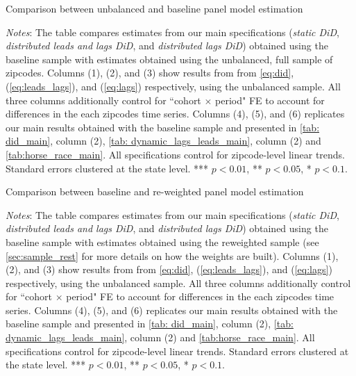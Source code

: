 \clearpage
\begin{table}[h!]
    \caption{Comparison between unbalanced and baseline panel model estimation}
    \label{tab:comparison_unbal_base}
    \centering
     \resizebox{\textwidth}{!}{
    \vspace{0pt}    
    
    }
    \begin{minipage}{.95\textwidth} \footnotesize
		\vspace{3mm} 
		\textit{Notes}: The table compares estimates from our main specifications (\textit{static DiD}, 
		\textit{distributed leads and lags DiD}, and \textit{distributed lags DiD}) obtained using the 
		baseline sample with estimates obtained using the unbalanced, full sample of zipcodes. Columns 
		(1), (2), and (3) show results from from \autoref{eq:did}, (\ref{eq:leads_lags}), and (\ref{eq:lags}) 
		respectively, using the unbalanced sample. All three columns additionally control for ``cohort 
		$\times$ period" FE to account for differences in the each zipcodes time series. Columns (4), (5), 
		and (6) replicates our main results obtained with the baseline sample and presented in 
		\autoref{tab: did_main}, column (2), \autoref{tab: dynamic_lags_leads_main}, column (2) and 
		\autoref{tab:horse_race_main}. All specifications control for zipcode-level linear trends. 
		Standard errors clustered at the state level. *** $p < 0.01$, ** $p < 0.05$, * $p < 0.1$.  
	\end{minipage}
\end{table}

\clearpage
\begin{table}[h!]
    \caption{Comparison between baseline and re-weighted panel model estimation}
    \label{tab:comparison_wgt_base}
    \centering
    \resizebox{\textwidth}{!}{
	    \vspace{0pt}    
	    
    }
    \begin{minipage}{.95\textwidth} \footnotesize
		\vspace{3mm} 
		\textit{Notes}: The table compares estimates from our main specifications (\textit{static 
		DiD}, \textit{distributed leads and lags DiD}, and \textit{distributed lags DiD}) obtained 
		using the baseline sample with estimates obtained using the reweighted sample (see 
		\autoref{sec:sample_rest} for more details on how the weights are built). Columns (1), (2), 
		and (3) show results from from \autoref{eq:did}, (\ref{eq:leads_lags}), and (\ref{eq:lags}) 
		respectively, using the unbalanced sample. All three columns additionally control for 
		``cohort $\times$ period" FE to account for differences in the each zipcodes time series. 
		Columns (4), (5), and (6) replicates our main results obtained with the baseline sample 
		and presented in \autoref{tab: did_main}, column (2), \autoref{tab: dynamic_lags_leads_main}, 
		column (2) and \autoref{tab:horse_race_main}. All specifications control for zipcode-level 
		linear trends. Standard errors clustered at the state level. *** $p < 0.01$, ** $p < 0.05$, 
		* $p < 0.1$.
	\end{minipage}
\end{table}

